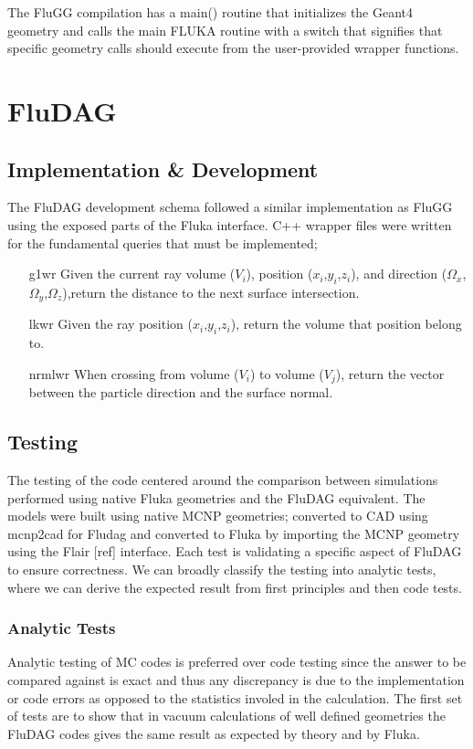 \documentclass{anstrans}
\begin{document}
The FluGG compilation has a main() routine that initializes the Geant4 geometry and calls the main FLUKA routine with a switch that signifies that specific geometry calls should execute from the user-provided wrapper functions.
\section{FluDAG}
\subsection{Implementation \& Development}
The FluDAG development schema followed a similar implementation as FluGG using the exposed parts of the Fluka interface. C++ wrapper files were written for the fundamental queries that must be implemented;
\begin{itemize}
\item[g1wr]{Given the current ray volume ($V_i$), position ($x_i$,$y_i$,$z_i$), and direction ($\Omega_x$,$\Omega_y$,$\Omega_z$),return the distance to the next surface intersection.}
\item[lkwr]{Given the ray position ($x_i$,$y_i$,$z_i$), return the volume that position belong to.}	
\item[nrmlwr]{When crossing from volume ($V_i$) to volume ($V_j$), return
the vector between the particle direction and the surface normal.}
\end{itemize}
\subsection{Testing}
The testing of the code centered around the comparison between simulations performed using native Fluka geometries and the FluDAG equivalent. The models were built using native MCNP geometries; converted to CAD using mcnp2cad for Fludag and converted to Fluka by importing the MCNP geometry using the Flair [ref] interface. Each test is validating a specific aspect of FluDAG to ensure correctness. We can broadly classify the testing into analytic tests, where we can derive the expected result from first principles and then code tests.
\subsubsection{Analytic Tests}
Analytic testing of MC codes is preferred over code testing since the answer to be compared against is exact and thus any discrepancy is due to the implementation or code errors as opposed to the statistics involed in the calculation. The first set of tests are to show that in vacuum calculations of well defined geometries the FluDAG codes gives the same result as expected by theory and by Fluka.
\end{document}

